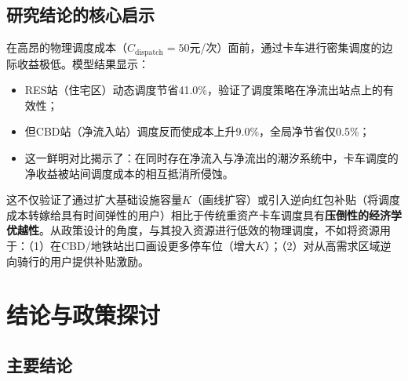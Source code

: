 \documentclass[12pt,a4paper]{article}
\begin{document}
\subsection{研究结论的核心启示}

在高昂的物理调度成本（$C_{\text{dispatch}}=50$元/次）面前，通过卡车进行密集调度的边际收益极低。模型结果显示：
\begin{itemize}
    \item RES站（住宅区）动态调度节省41.0\%，验证了调度策略在净流出站点上的有效性；
    \item 但CBD站（净流入站）调度反而使成本上升9.0\%，全局净节省仅0.5\%；
    \item 这一鲜明对比揭示了：在同时存在净流入与净流出的潮汐系统中，卡车调度的净收益被站间调度成本的相互抵消所侵蚀。
\end{itemize}

这不仅验证了通过扩大基础设施容量$K$（画线扩容）或引入逆向红包补贴（将调度成本转嫁给具有时间弹性的用户）相比于传统重资产卡车调度具有\textbf{压倒性的经济学优越性}。从政策设计的角度，与其投入资源进行低效的物理调度，不如将资源用于：（1）在CBD/地铁站出口画设更多停车位（增大$K$）；（2）对从高需求区域逆向骑行的用户提供补贴激励。

\section{结论与政策探讨}

\subsection{主要结论}
\end{document}
